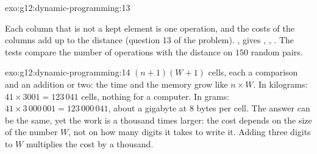 \begin{solution}{exo:g12:dynamic-programming:13}
\smallskip\noindent\hspace*{2em}

\noindent\hspace*{4em}

\noindent\hspace*{4em}

\noindent\hspace*{6em}

\noindent\hspace*{8em}

\noindent\hspace*{6em}

\noindent\hspace*{8em}

\noindent\hspace*{6em}

\noindent\hspace*{8em}

\noindent\hspace*{4em}

\smallskip\noindent Each column that is not a kept element is one operation, and the costs of the columns add up to
the distance (question 13 of the problem). ,  gives ,
, . The tests compare the number of operations with the distance on $150$ random
pairs.
\end{solution}

\begin{solution}{exo:g12:dynamic-programming:14}
$(n + 1)(W + 1)$ cells, each a comparison and an addition or two: the time and the memory grow like $n \times W$.
In kilograms: $41 \times 3001 = 123\,041$ cells, nothing for a computer. In grams: $41 \times 3\,000\,001 =
123\,000\,041$, about a gigabyte at $8$ bytes per cell. The answer can be the same, yet the work is a thousand times
larger: the cost depends on the size of the number $W$, not on how many digits it takes to write it. Adding three
digits to $W$ multiplies the cost by a thousand.
\end{solution}

